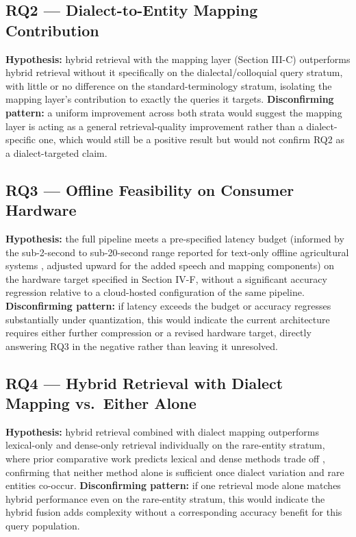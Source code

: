 \documentclass[conference]{IEEEtran}
\begin{document}
\subsection{RQ2 --- Dialect-to-Entity Mapping Contribution}
\textbf{Hypothesis:} hybrid retrieval with the mapping layer (Section III-C) outperforms hybrid retrieval without it specifically on the dialectal/colloquial query stratum, with little or no difference on the standard-terminology stratum, isolating the mapping layer's contribution to exactly the queries it targets. \textbf{Disconfirming pattern:} a uniform improvement across both strata would suggest the mapping layer is acting as a general retrieval-quality improvement rather than a dialect-specific one, which would still be a positive result but would not confirm RQ2 as a dialect-targeted claim.

\subsection{RQ3 --- Offline Feasibility on Consumer Hardware}
\textbf{Hypothesis:} the full pipeline meets a pre-specified latency budget (informed by the sub-2-second to sub-20-second range reported for text-only offline agricultural systems \cite{dubey2025aahar,hossain2026bengalirag}, adjusted upward for the added speech and mapping components) on the hardware target specified in Section IV-F, without a significant accuracy regression relative to a cloud-hosted configuration of the same pipeline. \textbf{Disconfirming pattern:} if latency exceeds the budget or accuracy regresses substantially under quantization, this would indicate the current architecture requires either further compression or a revised hardware target, directly answering RQ3 in the negative rather than leaving it unresolved.

\subsection{RQ4 --- Hybrid Retrieval with Dialect Mapping vs.\ Either Alone}
\textbf{Hypothesis:} hybrid retrieval combined with dialect mapping outperforms lexical-only and dense-only retrieval individually on the rare-entity stratum, where prior comparative work predicts lexical and dense methods trade off \cite{sultania2024hybridsearch}, confirming that neither method alone is sufficient once dialect variation and rare entities co-occur. \textbf{Disconfirming pattern:} if one retrieval mode alone matches hybrid performance even on the rare-entity stratum, this would indicate the hybrid fusion adds complexity without a corresponding accuracy benefit for this query population.
\end{document}
